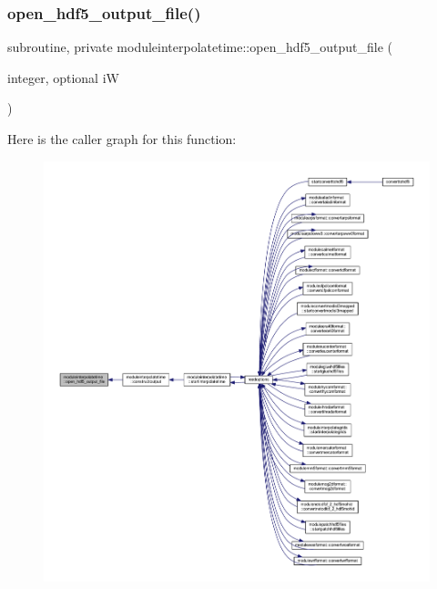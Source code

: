 \subsubsection{\texorpdfstring{open\+\_\+hdf5\+\_\+output\+\_\+file()}{open\_hdf5\_output\_file()}}
{\footnotesize\ttfamily subroutine, private moduleinterpolatetime\+::open\+\_\+hdf5\+\_\+output\+\_\+file (\begin{DoxyParamCaption}\item[{integer, optional}]{iW }\end{DoxyParamCaption})\hspace{0.3cm}{\ttfamily [private]}}

Here is the caller graph for this function\+:\nopagebreak
\begin{figure}[H]
\begin{center}
\leavevmode
\includegraphics[width=350pt]{namespacemoduleinterpolatetime_af0bb28d64bc31ae488ca76a682f246f5_icgraph}
\end{center}
\end{figure}
\mbox{\label{namespacemoduleinterpolatetime_a89452771fcee1960a251bf4fb95851c6}} 
